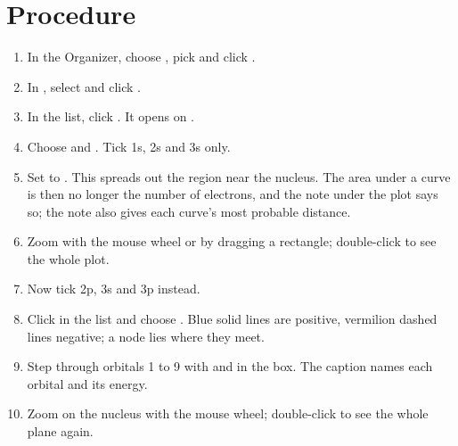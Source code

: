 \section{Procedure}
\begin{enumerate}
	\item In the Organizer, choose , pick  and click .
	\item In , select  and click .
	\item In the  list, click . It opens on .
	\item Choose  and . Tick 1s, 2s and 3s only.
	\item Set  to . This spreads out the region near the nucleus. The area under a curve is then no longer the number of electrons, and the note under the plot says so; the note also gives each curve's most probable distance.
	\item Zoom with the mouse wheel or by dragging a rectangle; double-click to see the whole plot.
	\item Now tick 2p, 3s and 3p instead.
	\item Click  in the  list and choose . Blue solid lines are positive, vermilion dashed lines negative; a node lies where they meet.
	\item Step through orbitals 1 to 9 with \ctrl{$-$} and \ctrl{+} in the  box. The caption names each orbital and its energy.
	\item Zoom on the nucleus with the mouse wheel; double-click to see the whole plane again.
\end{enumerate}

